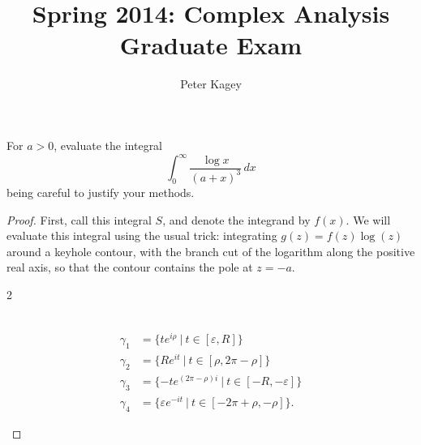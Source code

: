 \documentclass{article}
\newenvironment{problem}[2][Problem]{\begin{trivlist}
\item[\hskip \labelsep {\bfseries #1}\hskip \labelsep {\bfseries #2.}]}{\end{trivlist}}
\begin{document}
\title{Spring 2014: Complex Analysis Graduate Exam}
\author{Peter Kagey}

\maketitle

\begin{problem}{1}
  For $a > 0$, evaluate the integral \[
    \int_0^\infty \frac{\log x}{(a + x)^3}\, dx
  \] being careful to justify your methods.
\end{problem}

\begin{proof}
  First, call this integral $S$, and denote the integrand by $f(x)$.
  We will evaluate this integral using the usual trick: integrating
  $g(z) = f(z)\log(z)$ around a keyhole contour, with the branch cut of
  the logarithm along the positive real axis, so that the contour contains the
  pole at $z = -a$.

  \begin{multicols}{2}
  \\
  \begin{align}
    \gamma_{1} &= \{te^{i\rho}\ |\ t \in [\varepsilon, R] \} \\
    \gamma_{2} &= \{R e^{it}\ |\ t \in [\rho,2\pi-\rho] \} \\
    \gamma_{3} &= \{-te^{(2\pi -\rho)i}\ |\ t \in [-R, -\varepsilon]\} \\
    \gamma_{4} &= \{\varepsilon e^{-it}\ |\ t \in [-2\pi + \rho, -\rho]\}.
  \end{align}
  \end{multicols}


\end{proof}
\end{document}
